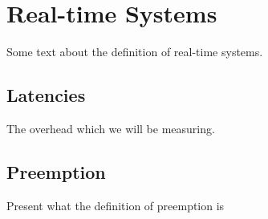 \chapter{Real-time Systems}
Some text about the definition of real-time systems.
\section{Latencies}
The overhead which we will be measuring.
\section{Preemption}
Present what the definition of preemption is